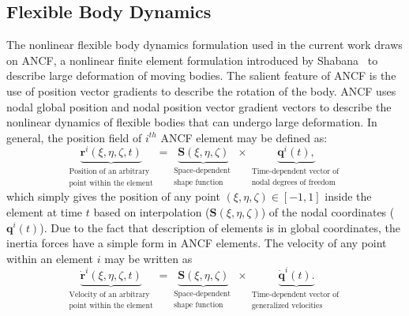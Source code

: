 \subsection{Flexible Body Dynamics}
The nonlinear flexible body dynamics formulation used in the current work draws on ANCF, a nonlinear finite element formulation introduced by Shabana~\cite{Shabana1997} to describe large deformation of moving bodies. The salient feature of ANCF is the use of position vector gradients to describe the rotation of the body. ANCF uses nodal global position and nodal position vector gradient vectors to describe the nonlinear dynamics of flexible bodies that can undergo large deformation.
In general, the position field of $i^{th}$ ANCF element may be defined as: 
\begin{equation} \label{eq:ANCF_r}
\underbrace{{{\bm{r}}^{i}}(\xi,\eta,\zeta,t)}_{\begin{smallmatrix}
	\text{Position of an arbitrary } \\
	\text{point within the element}
	\end{smallmatrix}}=\underbrace{\bm{S}(\xi,\eta,\zeta)}_{\begin{smallmatrix}
	\text{Space-dependent } \\
	\text{shape function}
	\end{smallmatrix}}\times \underbrace{{{\bm{q}}^{i}}(t),}_{\begin{smallmatrix}
	\text{Time-dependent vector of } \\
	\text{nodal degrees of freedom}
	\end{smallmatrix}}
\end{equation}
which simply gives the position of any point $(\xi,\eta,\zeta) \in [-1,1]$ inside the element at time $t$ based on interpolation ($\bm{S} (\xi,\eta,\zeta) $) of the nodal coordinates ($\bm{q}^{i}(t)$). Due to the fact that description of elements is in global coordinates, the inertia forces have a simple form in ANCF elements. The velocity of any point within an element $i$ may be written as
\begin{equation} \label{eq:ANCF_r_dot}
\underbrace{\bm{\dot{r}}^{i}(\xi,\eta,\zeta,t)}_{\begin{smallmatrix}
	\text{Velocity of an arbitrary } \\
	\text{point within the element}
	\end{smallmatrix}}=\underbrace{\bm{S}(\xi,\eta,\zeta)}_{\begin{smallmatrix}
	\text{Space-dependent } \\
	\text{shape function}
	\end{smallmatrix}}\times \underbrace{\bm{\dot{q}}^{i}(t).}_{\begin{smallmatrix}
	\text{Time-dependent vector of } \\
	\text{generalized velocities}
	\end{smallmatrix}}
\end{equation}

